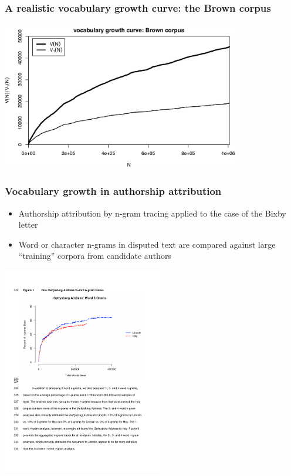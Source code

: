 \documentclass[t]{beamer} %
\begin{document}
\begin{frame}
  \frametitle{A realistic vocabulary growth curve: the Brown corpus}

  \ungap[1]
  \begin{center}
    \includegraphics[height=6.5cm]{../plots/tutorial_brown_vgc}%
  \end{center}
\end{frame}

\begin{frame}
  \frametitle{Vocabulary growth in authorship attribution}

  \begin{itemize}
  \item Authorship attribution by n-gram tracing applied to the case of the Bixby letter \citep{Grieve:etc:18}
  \item Word or character n-grams in disputed text are compared against large ``training'' corpora from candidate authors
  \end{itemize}

  \begin{center}
    \includegraphics[width=7cm]{img/GrieveEtc2018_fig1}
  \end{center}
\end{frame}
\end{document}
